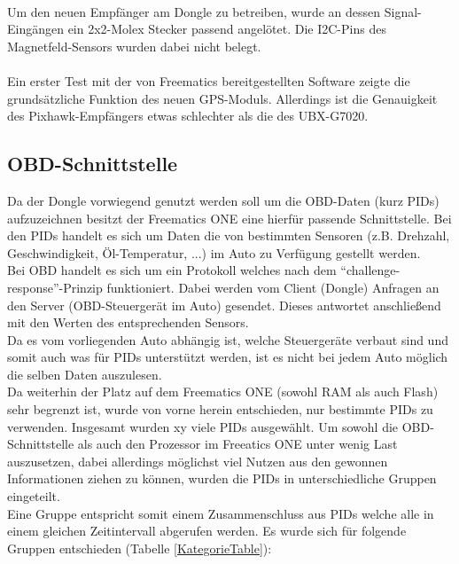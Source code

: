 \paragraph{}
Um den neuen Empfänger am Dongle zu betreiben, wurde an dessen Signal-Eingängen ein 2x2-Molex Stecker passend angelötet. Die I2C-Pins des Magnetfeld-Sensors wurden dabei nicht belegt.
\paragraph{}
Ein erster Test mit der von Freematics bereitgestellten Software zeigte die grundsätzliche Funktion des neuen GPS-Moduls. Allerdings ist die Genauigkeit des Pixhawk-Empfängers etwas schlechter als die des UBX-G7020.

	\subsection{ \ac{OBD}-Schnittstelle}
		Da der Dongle vorwiegend genutzt werden soll um die \ac{OBD}-Daten (kurz \acp{PID}) aufzuzeichnen besitzt der Freematics ONE eine hierfür passende Schnittstelle. Bei den \acp{PID}\cite{OBD-2.net2018} handelt es sich um Daten die von bestimmten Sensoren (z.B. Drehzahl, Geschwindigkeit, Öl-Temperatur, ...) im Auto zu Verfügung gestellt werden.
		\ \\
		Bei \ac{OBD} handelt es sich um ein Protokoll welches nach dem \enquote{challenge-response}-Prinzip funktioniert. Dabei werden vom Client (Dongle) Anfragen an den Server (\ac{OBD}-Steuergerät im Auto) gesendet. Dieses antwortet anschließend mit den Werten des entsprechenden Sensors.
		\ \\
		Da es vom vorliegenden Auto abhängig ist, welche Steuergeräte verbaut sind und somit auch was für \acp{PID} unterstützt werden, ist es nicht bei jedem Auto möglich die selben Daten auszulesen.
		\ \\
		Da weiterhin der Platz auf dem Freematics ONE (sowohl RAM als auch Flash) sehr begrenzt ist, wurde von vorne herein entschieden, nur bestimmte \acp{PID} zu verwenden. Insgesamt wurden xy viele \acp{PID} ausgewählt. Um sowohl die \ac{OBD}-Schnittstelle als auch den Prozessor im Freeatics ONE unter wenig Last auszusetzen, dabei allerdings möglichst viel Nutzen aus den gewonnen Informationen ziehen zu können, wurden die \acp{PID} in unterschiedliche Gruppen eingeteilt. 
		\ \\
		Eine Gruppe entspricht somit einem Zusammenschluss aus \acp{PID} welche alle in einem gleichen Zeitintervall abgerufen werden. Es wurde sich für folgende Gruppen entschieden (Tabelle \ref{KategorieTable}):
		
